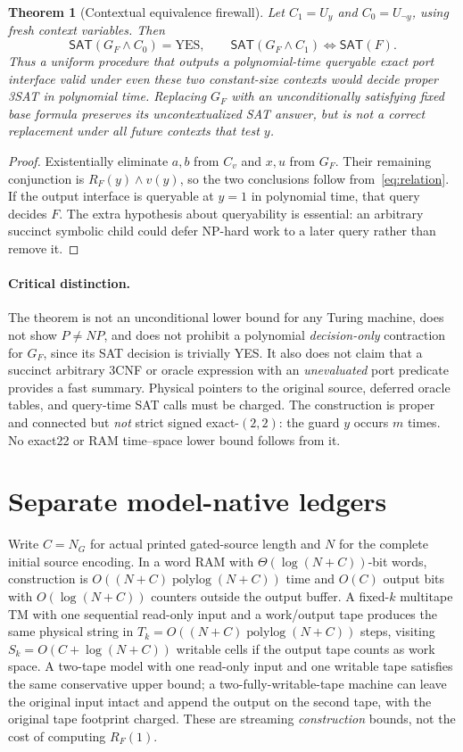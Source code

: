 \documentclass[11pt]{article}
\newtheorem{theorem}{Theorem}
\begin{document}
\begin{theorem}[Contextual equivalence firewall]\label{thm:context}
Let $C_1=U_y$ and $C_0=U_{\neg y}$, using fresh context variables. Then
\[
 \mathsf{SAT}(G_F\wedge C_0)=\mathrm{YES},\qquad
 \boxed{\mathsf{SAT}(G_F\wedge C_1)\iff\mathsf{SAT}(F).}
\]
Thus a uniform procedure that outputs \emph{a polynomial-time queryable exact port interface} valid under even these two constant-size contexts would decide proper 3SAT in polynomial time. Replacing $G_F$ with an unconditionally satisfying fixed base formula preserves its \emph{uncontextualized} SAT answer, but is not a correct replacement under all future contexts that test $y$.
\end{theorem}
\begin{proof}
Existentially eliminate $a,b$ from $C_v$ and $x,u$ from $G_F$. Their remaining conjunction is $R_F(y)\wedge v(y)$, so the two conclusions follow from~\eqref{eq:relation}. If the output interface is queryable at $y=1$ in polynomial time, that query decides $F$. The extra hypothesis about queryability is essential: an arbitrary succinct symbolic child could defer NP-hard work to a later query rather than remove it.
\end{proof}

\paragraph{Critical distinction.} The theorem is not an unconditional lower bound for any Turing machine, does not show $P\ne NP$, and does not prohibit a polynomial \emph{decision-only} contraction for $G_F$, since its SAT decision is trivially YES. It also does not claim that a succinct arbitrary 3CNF or oracle expression with an \emph{unevaluated} port predicate provides a fast summary. Physical pointers to the original source, deferred oracle tables, and query-time SAT calls must be charged. The construction is proper and connected but \emph{not} strict signed exact-$(2,2)$: the guard $y$ occurs $m$ times. No exact22 or RAM time--space lower bound follows from it.

\section{Separate model-native ledgers}
Write $C=N_G$ for actual printed gated-source length and $N$ for the complete initial source encoding. In a word RAM with $\Theta(\log(N+C))$-bit words, construction is $O((N+C)\operatorname{polylog}(N+C))$ time and $O(C)$ output bits with $O(\log(N+C))$ counters outside the output buffer. A fixed-$k$ multitape TM with one sequential read-only input and a work/output tape produces the same physical string in $T_k=O((N+C)\operatorname{polylog}(N+C))$ steps, visiting $S_k=O(C+\log(N+C))$ writable cells if the output tape counts as work space. A two-tape model with one read-only input and one writable tape satisfies the same conservative upper bound; a two-fully-writable-tape machine can leave the original input intact and append the output on the second tape, with the original tape footprint charged. These are streaming \emph{construction} bounds, not the cost of computing $R_F(1)$.
\end{document}

